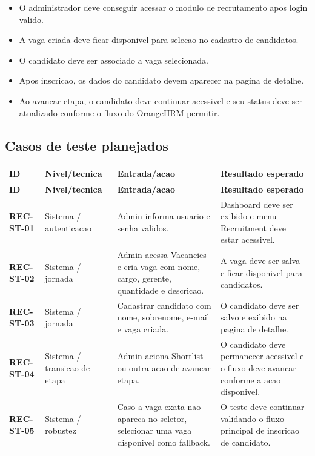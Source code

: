 \documentclass[12pt,a4paper]{article}
\newcommand{\Caso}[1]{\textbf{#1}}
\begin{document}
\begin{itemize}
    \item O administrador deve conseguir acessar o modulo de recrutamento apos login valido.
    \item A vaga criada deve ficar disponivel para selecao no cadastro de candidatos.
    \item O candidato deve ser associado a vaga selecionada.
    \item Apos inscricao, os dados do candidato devem aparecer na pagina de detalhe.
    \item Ao avancar etapa, o candidato deve continuar acessivel e seu status deve ser atualizado conforme o fluxo do OrangeHRM permitir.
\end{itemize}

\newpage
\subsection{Casos de teste planejados}

\begin{longtable}{p{2.4cm}p{2.9cm}p{4.5cm}p{4.6cm}}
\toprule
\textbf{ID} & \textbf{Nivel/tecnica} & \textbf{Entrada/acao} & \textbf{Resultado esperado} \\
\midrule
\endfirsthead
\toprule
\textbf{ID} & \textbf{Nivel/tecnica} & \textbf{Entrada/acao} & \textbf{Resultado esperado} \\
\midrule
\endhead
\Caso{REC-ST-01} & Sistema / autenticacao & Admin informa usuario e senha validos. & Dashboard deve ser exibido e menu Recruitment deve estar acessivel. \\
\Caso{REC-ST-02} & Sistema / jornada & Admin acessa Vacancies e cria vaga com nome, cargo, gerente, quantidade e descricao. & A vaga deve ser salva e ficar disponivel para candidatos. \\
\Caso{REC-ST-03} & Sistema / jornada & Cadastrar candidato com nome, sobrenome, e-mail e vaga criada. & O candidato deve ser salvo e exibido na pagina de detalhe. \\
\Caso{REC-ST-04} & Sistema / transicao de etapa & Admin aciona Shortlist ou outra acao de avancar etapa. & O candidato deve permanecer acessivel e o fluxo deve avancar conforme a acao disponivel. \\
\Caso{REC-ST-05} & Sistema / robustez & Caso a vaga exata nao apareca no seletor, selecionar uma vaga disponivel como fallback. & O teste deve continuar validando o fluxo principal de inscricao de candidato. \\
\bottomrule
\end{longtable}
\end{document}
